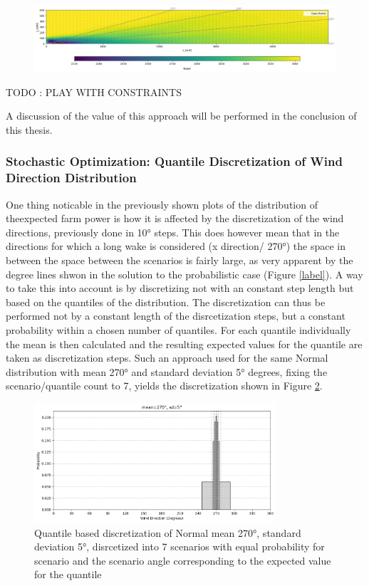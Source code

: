 \begin{figure}[h] 
	\centering
	\includegraphics[width=1\textwidth]{figures/optimization/prob_data_lininter.png} 
	\caption{}
	\label{fig:prob_data_lininter}
\end{figure} 

TODO : PLAY WITH CONSTRAINTS

A discussion of the value of this approach will be performed in the conclusion of this thesis. 
	
\subsubsection{Stochastic Optimization: Quantile Discretization of Wind Direction Distribution }

One thing noticable in the previously shown plots of the distribution of theexpected farm power is how it is affected by the discretization of the wind directions, previously done in 10° steps. This does however mean that in the directions for which a long wake is considered (x direction/ 270°) the space in between the space between the scenarios  is fairly large, as very apparent  by the degree lines shwon in the solution to the probabilistic case (Figure \ref{label}). A way to take this into account is by discretizing not with an constant step length but based on the quantiles of the distribution. The discretization can thus be performed not by a constant length of the disrcetization steps, but a constant probability within a chosen number of quantiles. For each quantile individually the mean is then calculated and the resulting expected values for the quantile are taken as discretization steps. Such an approach used for the same Normal distribution with mean 270° and standard deviation 5° degrees, fixing the scenario/quantile count to 7, yields the discretization shown in Figure \ref{fig:wind_dist_opti_quantiles}. 

\begin{figure}[h] 
	\centering
	\includegraphics[width=0.8\textwidth]{figures/optimization/wind_dist_opti_quantiles.png} 
	\caption{Quantile based discretization of Normal mean 270°,  standard deviation 5°, disrcetized into 7 scenarios with equal probability for scenario and the scenario angle corresponding to the expected value for the quantile }
	\label{fig:wind_dist_opti_quantiles}
\end{figure} 

